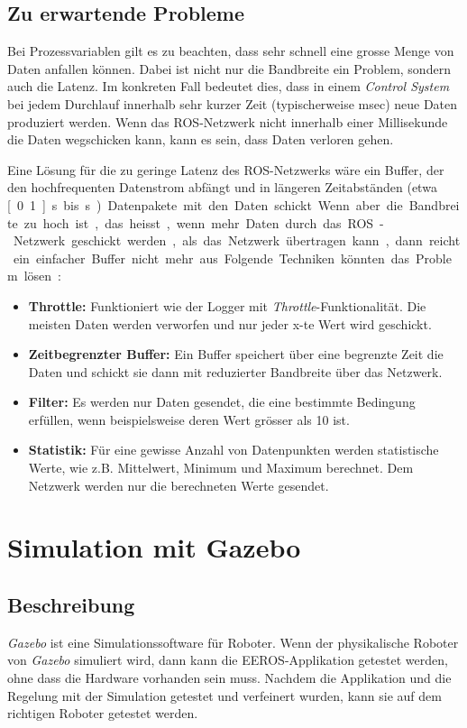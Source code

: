 \subsection{Zu erwartende Probleme}
Bei Prozessvariablen gilt es zu beachten, dass sehr schnell eine grosse Menge von Daten anfallen können.
Dabei ist nicht nur die Bandbreite ein Problem, sondern auch die Latenz.
Im konkreten Fall bedeutet dies, dass in einem \textit{Control System} bei jedem Durchlauf innerhalb sehr kurzer Zeit (typischerweise \unit[1]{msec}) neue Daten produziert werden.
Wenn das ROS-Netzwerk nicht innerhalb einer Millisekunde die Daten wegschicken kann, kann es sein, dass Daten verloren gehen.

Eine Lösung für die zu geringe Latenz des ROS-Netzwerks wäre ein Buffer, der den hochfrequenten Datenstrom abfängt und in längeren Zeitabständen (etwa \unit[0.1]{s} bis \unit[1]{s}) Datenpakete mit den Daten schickt.


Wenn aber die Bandbreite zu hoch ist, das heisst, wenn mehr Daten durch das ROS-Netzwerk geschickt werden, als das Netzwerk übertragen kann, dann reicht ein einfacher Buffer nicht mehr aus.
Folgende Techniken könnten das Problem lösen:
\begin{itemize}
\item \textbf{Throttle:} Funktioniert wie der Logger mit \textit{Throttle}-Funktionalität. Die meisten Daten werden verworfen und nur jeder x-te Wert wird geschickt.
\item \textbf{Zeitbegrenzter Buffer:} Ein Buffer speichert über eine begrenzte Zeit die Daten und schickt sie dann mit reduzierter Bandbreite über das Netzwerk.
\item \textbf{Filter:} Es werden nur Daten gesendet, die eine bestimmte Bedingung erfüllen, wenn beispielsweise deren Wert grösser als 10 ist.
\item \textbf{Statistik:} Für eine gewisse Anzahl von Datenpunkten werden statistische Werte, wie z.B. Mittelwert, Minimum und Maximum berechnet. Dem Netzwerk werden nur die berechneten Werte gesendet.
\end{itemize}


\section{Simulation mit Gazebo}
\subsection{Beschreibung}
\textit{Gazebo} ist eine Simulationssoftware für Roboter.
Wenn der physikalische Roboter von \textit{Gazebo} simuliert wird, dann kann die EEROS-Applikation getestet werden, ohne dass die Hardware vorhanden sein muss.
Nachdem die Applikation und die Regelung mit der Simulation getestet und verfeinert wurden, kann sie auf dem richtigen Roboter getestet werden.


